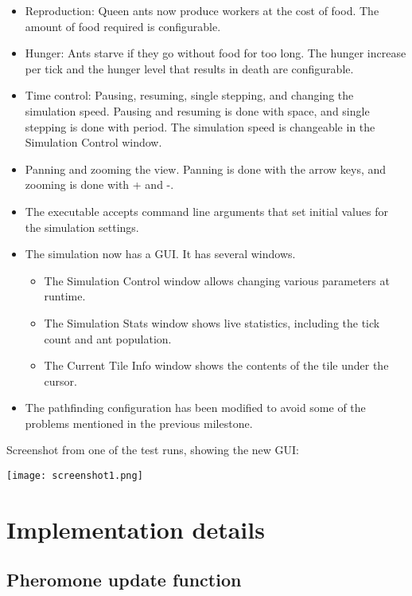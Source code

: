 \documentclass{article}
\begin{document}
\begin{itemize}

    \item Reproduction: Queen ants now produce workers at the cost of food.  The amount of food required is configurable.
    \item Hunger:  Ants starve if they go without food for too long.  The hunger increase per tick and the hunger level that results in death are configurable.
    \item Time control: Pausing, resuming, single stepping, and changing the simulation speed.  Pausing and resuming is done with space, and single stepping is done with period.  The simulation speed is changeable in the Simulation Control window.
    \item Panning and zooming the view.  Panning is done with the arrow keys, and zooming is done with + and -.
    \item The executable accepts command line arguments that set initial values for the simulation settings.
    \item The simulation now has a GUI.  It has several windows.
    \begin{itemize}

    \item The Simulation Control window allows changing various parameters at runtime.
    \item The Simulation Stats window shows live statistics, including the tick count and ant population.
    \item The Current Tile Info window shows the contents of the tile under the cursor.

\end{itemize}

\item The pathfinding configuration has been modified to avoid some of the problems mentioned in the previous milestone.

\end{itemize}

Screenshot from one of the test runs, showing the new GUI:

\texttt{[image: screenshot1.png]}

\section{Implementation details}

\subsection{Pheromone update function}
\end{document}
